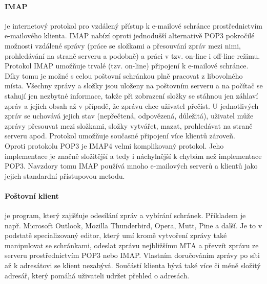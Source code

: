 \documentclass[10pt,a4paper]{article}
\begin{document}
\paragraph{IMAP} je internetový protokol pro vzdálený přístup k e-mailové schránce prostřednictvím e-mailového klienta. IMAP nabízí oproti jednodušší alternativě POP3 pokročilé možnosti vzdálené správy (práce se složkami a přesouvání zpráv mezi nimi, prohledávání na straně serveru a podobně) a práci v tzv. on-line i off-line režimu. Protokol IMAP umožňuje trvalé (tzv. on-line) připojení k e-mailové schránce. Díky tomu je možné s celou poštovní schránkou plně pracovat z libovolného místa. Všechny zprávy a složky jsou uloženy na poštovním serveru a na počítač se stahují jen nezbytné informace, takže při zobrazení složky se stáhnou jen záhlaví zpráv a jejich obsah až v případě, že zprávu chce uživatel přečíst. U jednotlivých zpráv se uchovává jejich stav (nepřečtená, odpovězená, důležitá), uživatel může zprávy přesouvat mezi složkami, složky vytvářet, mazat, prohledávat na straně serveru apod. Protokol umožňuje současné připojení více klientů zároveň. \\
Oproti protokolu POP3 je IMAP4 velmi komplikovaný protokol. Jeho implementace je značně složitější a tedy i náchylnější k chybám než implementace POP3. Navzdory tomu IMAP používá mnoho e-mailových serverů a klientů jako jejich standardní přístupovou metodu.
\paragraph{Poštovní klient} je program, který zajišťuje odesílání zpráv a vybírání schránek. Příkladem je např. Microsoft Outlook, Mozilla Thunderbird, Opera, Mutt, Pine a další. Je to v podstatě specializovaný editor, který umí kromě vytvoření zprávy také manipulovat se schránkami, odeslat zprávu nejbližšímu MTA a převzít zprávu ze serveru prostřednictvím POP3 nebo IMAP. Vlastním doručováním zprávy po síti až k adresátovi se klient nezabývá. Součástí klienta bývá také více či méně složitý adresář, který pomáhá uživateli udržet přehled o adresách.
\end{document}
